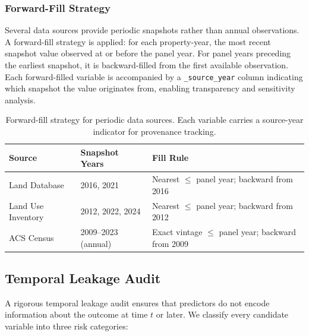 \subsubsection{Forward-Fill Strategy}
\label{sec:forwardfill}

Several data sources provide periodic snapshots rather than annual observations.
A forward-fill strategy is applied: for each property-year, the most recent
snapshot value observed at or before the panel year. For panel years preceding the
earliest snapshot, it is backward-filled from the first available observation.
Each forward-filled variable is accompanied by a \texttt{\_source\_year} column
indicating which snapshot the value originates from, enabling transparency and
sensitivity analysis.

\begin{table}[h]
\centering
\small
\begin{tabular}{lll}
\hline
\textbf{Source} & \textbf{Snapshot Years} & \textbf{Fill Rule} \\
\hline
Land Database & 2016, 2021 & Nearest $\leq$ panel year; backward from 2016 \\
Land Use Inventory & 2012, 2022, 2024 & Nearest $\leq$ panel year; backward from 2012 \\
ACS Census & 2009--2023 (annual) & Exact vintage $\leq$ panel year; backward from 2009 \\
\hline
\end{tabular}
\caption{Forward-fill strategy for periodic data sources. Each variable carries
a source-year indicator for provenance tracking.}
\label{tab:forwardfill}
\end{table}

\subsection{Temporal Leakage Audit}
\label{sec:leakage}

A rigorous temporal leakage audit ensures that predictors do not encode
information about the outcome at time $t$ or later.
We classify every candidate variable into three risk categories:

